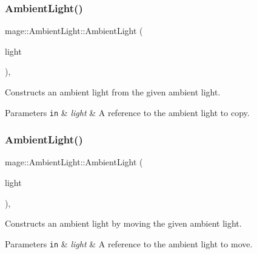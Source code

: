 \subsubsection{\texorpdfstring{Ambient\+Light()}{AmbientLight()}\hspace{0.1cm}{\footnotesize\ttfamily [2/3]}}
{\footnotesize\ttfamily mage\+::\+Ambient\+Light\+::\+Ambient\+Light (\begin{DoxyParamCaption}\item[{const \hyperlink{classmage_1_1_ambient_light}{Ambient\+Light} \&}]{light }\end{DoxyParamCaption})\hspace{0.3cm}{\ttfamily [default]}, {\ttfamily [noexcept]}}

Constructs an ambient light from the given ambient light.


\begin{DoxyParams}[1]{Parameters}
\mbox{\tt in}  & {\em light} & A reference to the ambient light to copy. \\
\hline
\end{DoxyParams}
\hypertarget{classmage_1_1_ambient_light_a2807ca8add5f34da2e63ef8fdb80f7e1}{}\label{classmage_1_1_ambient_light_a2807ca8add5f34da2e63ef8fdb80f7e1} 
\subsubsection{\texorpdfstring{Ambient\+Light()}{AmbientLight()}\hspace{0.1cm}{\footnotesize\ttfamily [3/3]}}
{\footnotesize\ttfamily mage\+::\+Ambient\+Light\+::\+Ambient\+Light (\begin{DoxyParamCaption}\item[{\hyperlink{classmage_1_1_ambient_light}{Ambient\+Light} \&\&}]{light }\end{DoxyParamCaption})\hspace{0.3cm}{\ttfamily [default]}, {\ttfamily [noexcept]}}

Constructs an ambient light by moving the given ambient light.


\begin{DoxyParams}[1]{Parameters}
\mbox{\tt in}  & {\em light} & A reference to the ambient light to move. \\
\hline
\end{DoxyParams}
\hypertarget{classmage_1_1_ambient_light_a511bb794b11f112e750da09f4044e7db}{}\label{classmage_1_1_ambient_light_a511bb794b11f112e750da09f4044e7db} 
